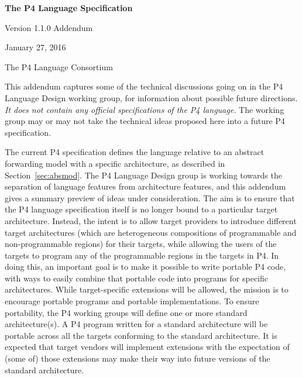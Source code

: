 \documentclass[12pt]{article}
\begin{document}
\vspace{2cm}

\centerline{\sffamily\bfseries\huge The P4 Language Specification}
\vspace{3mm}
\centerline{\sffamily\Large Version 1.1.0 Addendum}
\vspace{3mm}
\centerline{\sffamily\large January 27, 2016}
\vspace{8mm}
\centerline{\sffamily\large The P4 Language Consortium}

\date{January 27, 2016}
\thispagestyle{firstpagestyle}

This addendum captures some of the technical discussions going on
in the P4 Language Design working group, for information about possible future
directions.  \textit{It does not contain any
official specifications of the P4 language.} The working group may or may not
take the technical ideas proposed here into a future P4 specification.


The current P4 specification defines the language relative to an
abstract forwarding model with a specific architecture, as described
in Section~\ref{sec:absmod}.  The P4 Language Design group is working
towards the separation of language features from architecture features,
and this addendum gives a summary preview of ideas under consideration.
The aim is to ensure that the P4 language specification itself is no longer
bound to a particular target architecture.  Instead, the intent is to
allow target providers to introduce different target architectures
(which are heterogeneous compositions of programmable and non-programmable
regions) for their targets, while allowing the users of the targets to program
any of the programmable regions in the targets in P4.  In doing this, an
important goal is to make it possible to write portable P4 code, with ways to
easily combine that portable code into programs for specific architectures.
While target-specific extensions will be allowed, the mission is to encourage
portable programs and portable implementations.  To ensure portability,
the P4 working groups will define one or more standard architecture(s).
A P4 program written for a standard architecture will be portable across all
the targets conforming to the standard architecture.  It is expected that target
vendors will implement extensions with the expectation of (some of) those
extensions may make their way into future versions of the standard architecture.
\end{document}
